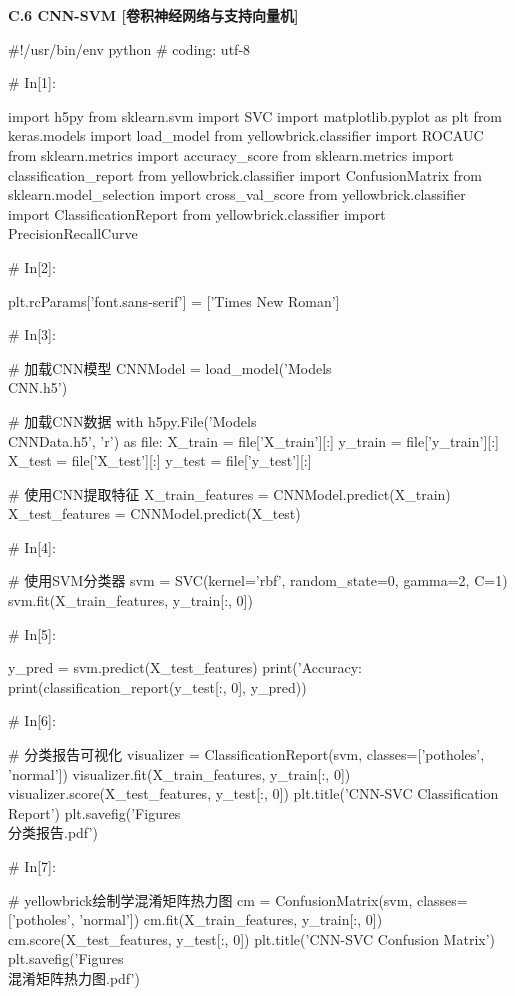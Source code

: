 \documentclass{MathorCupmodeling}
\begin{document}
\textbf{C.6 CNN-SVM [卷积神经网络与支持向量机]}
\begin{python}
#!/usr/bin/env python
# coding: utf-8

# In[1]:


import h5py
from sklearn.svm import SVC
import matplotlib.pyplot as plt
from keras.models import load_model
from yellowbrick.classifier import ROCAUC
from sklearn.metrics import accuracy_score
from sklearn.metrics import classification_report
from yellowbrick.classifier import ConfusionMatrix
from sklearn.model_selection import cross_val_score
from yellowbrick.classifier import ClassificationReport
from yellowbrick.classifier import PrecisionRecallCurve

# In[2]:


plt.rcParams['font.sans-serif'] = ['Times New Roman']

# In[3]:


# 加载CNN模型
CNNModel = load_model('Models\\CNN.h5')

# 加载CNN数据
with h5py.File('Models\\CNNData.h5', 'r') as file:
    X_train = file['X_train'][:]
    y_train = file['y_train'][:]
    X_test = file['X_test'][:]
    y_test = file['y_test'][:]

# 使用CNN提取特征
X_train_features = CNNModel.predict(X_train)
X_test_features = CNNModel.predict(X_test)

# In[4]:


# 使用SVM分类器
svm = SVC(kernel='rbf', random_state=0, gamma=2, C=1)
svm.fit(X_train_features, y_train[:, 0])

# In[5]:


y_pred = svm.predict(X_test_features)
print('Accuracy: %
print(classification_report(y_test[:, 0], y_pred))

# In[6]:


# 分类报告可视化
visualizer = ClassificationReport(svm, classes=['potholes', 'normal'])
visualizer.fit(X_train_features, y_train[:, 0])
visualizer.score(X_test_features, y_test[:, 0])
plt.title('CNN-SVC Classification Report')
plt.savefig('Figures\\[CNN-SVC]分类报告.pdf')

# In[7]:


# yellowbrick绘制学混淆矩阵热力图
cm = ConfusionMatrix(svm, classes=['potholes', 'normal'])
cm.fit(X_train_features, y_train[:, 0])
cm.score(X_test_features, y_test[:, 0])
plt.title('CNN-SVC Confusion Matrix')
plt.savefig('Figures\\[CNN-SVC]混淆矩阵热力图.pdf')


\end{python}
\end{document}
